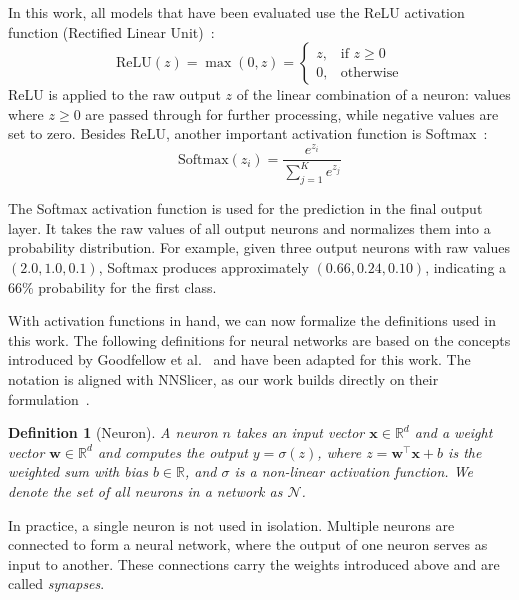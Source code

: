 \documentclass[
12pt,
fancyheadings,
a4paper,
twoside,
BCOR=0.7cm,
nobcorignoretitle,
grayscalebody,
]{stsreprt}
\newtheorem{definition}{Definition}[chapter]
\begin{document}
In this work, all models that have been evaluated use the ReLU activation function (Rectified
Linear Unit)~\cite{nair2010rectified}:
\begin{equation}
    \text{ReLU}(z) = \max(0, z) = \begin{cases} z, & \text{if } z \geqslant 0 \\ 0, & \text{otherwise} \end{cases}
\end{equation}
ReLU is applied to the raw output $z$ of the linear combination of a neuron: values where $z
\geqslant 0$ are passed through for further processing, while negative values are set to zero.
Besides ReLU, another important activation function is Softmax~\cite{Goodfellow-et-al-2016}:
\begin{equation}
    \text{Softmax}(z_i) = \frac{e^{z_i}}{\sum_{j=1}^{K} e^{z_j}}
\end{equation}

\noindent
The Softmax activation function is used for the prediction in the final output layer. It takes the
raw values of all output neurons and normalizes them into a probability distribution.
For example, given three output neurons with raw values $(2.0, 1.0, 0.1)$, Softmax produces
approximately $(0.66, 0.24, 0.10)$, indicating a 66\% probability for the first class.

With activation functions in hand, we can now formalize the definitions used in this work.
The following definitions for neural networks are based on the concepts introduced by Goodfellow et
al.~\cite{Goodfellow-et-al-2016} and have been adapted for this work. The notation is aligned with
NNSlicer, as our work builds directly on their formulation~\cite{zhang2020dynamic}.

\begin{definition}[Neuron]
\label{def:neuron}
A neuron $n$ takes an input vector $\mathbf{x} \in \mathbb{R}^d$ and a weight vector $\mathbf{w}
\in \mathbb{R}^d$ and computes the output $y = \sigma(z)$, where $z = \mathbf{w}^\top \mathbf{x} +
b$ is the weighted sum with bias $b \in \mathbb{R}$, and $\sigma$ is a non-linear activation
function.
We denote the set of all neurons in a network as $\mathcal{N}$.
\end{definition}

In practice, a single neuron is not used in isolation.
Multiple neurons are connected to form a neural network, where the output of one neuron serves as
input to another.
These connections carry the weights introduced above and are called \textit{synapses}.
\end{document}
